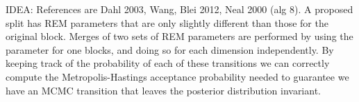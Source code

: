 \documentclass{article}
\begin{document}
IDEA: References are Dahl 2003, Wang, Blei 2012, Neal 2000 (alg 8).  A proposed split has REM parameters that are only slightly different than those for the original block.  Merges of two sets of REM parameters are performed by using the parameter for one blocks, and doing so for each dimension independently.  By keeping track of the probability of each of these transitions we can correctly compute the Metropolis-Hastings acceptance probability needed to guarantee we have an MCMC transition that leaves the posterior distribution invariant.








\end{document}

